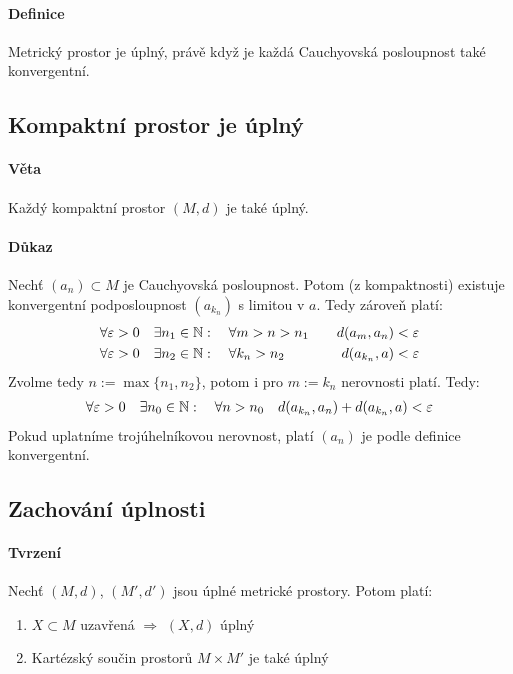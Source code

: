 \documentclass[a4paper,10pt]{article}
\begin{document}
\paragraph{Definice}
Metrický prostor je úplný, právě když je každá Cauchyovská posloupnost také konvergentní.

\subsection{Kompaktní prostor je úplný}
\setcounter{equation}{0}
\paragraph{Věta}
Každý kompaktní prostor $(M,d)$ je také úplný.
\paragraph{Důkaz}
Nechť $(a_n) \subset M$ je Cauchyovská posloupnost. Potom (z kompaktnosti)
existuje konvergentní podposloupnost $(a_{k_n})$ s limitou v $a$. Tedy zároveň
platí:
\begin{align}
	&\forall \varepsilon > 0 \quad \exists n_1 \in \mathbb{N}: \quad \forall m > n > n_1
	\quad &d(a_m, a_n) < \varepsilon \\
	&\forall \varepsilon > 0 \quad \exists n_2 \in \mathbb{N}: \quad \forall k_n > n_2 \quad
	&d(a_{k_n}, a) < \varepsilon
\end{align}
Zvolme tedy $n := \max\{ n_1, n_2 \}$, potom i pro $m := {k_n}$ nerovnosti
platí. Tedy:
\begin{align}
	\forall \varepsilon > 0 \quad \exists n_0 \in \mathbb{N}: \quad \forall n > n_0 \quad
	d(a_{k_n}, a_n) + d(a_{k_n}, a) < \varepsilon 
\end{align}
Pokud uplatníme trojúhelníkovou nerovnost, platí $(a_n)$ je podle definice
konvergentní.


\subsection{Zachování úplnosti}
\setcounter{equation}{0}
\paragraph{Tvrzení}
Nechť $(M, d)$, $(M', d')$ jsou úplné metrické prostory. Potom platí:
\begin{enumerate}
	\item $X \subset M$ uzavřená $\Rightarrow$ $(X, d)$ úplný
	\item Kartézský součin prostorů $M \times M'$ je také úplný
\end{enumerate}
\end{document}
